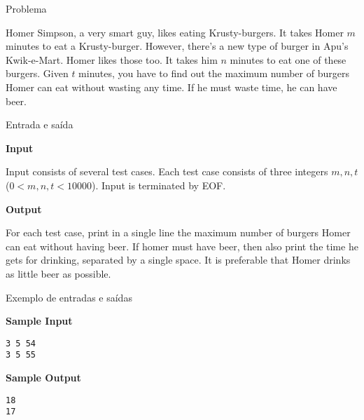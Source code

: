 
\begin{frame}[fragile]{Problema}

Homer Simpson, a very smart guy, likes eating Krusty-burgers. It takes Homer $m$ minutes to eat a
Krusty-burger. However, there’s a new type of burger in Apu’s Kwik-e-Mart. Homer likes those too.
It takes him $n$ minutes to eat one of these burgers. Given $t$ minutes, you have to find out the
maximum number of burgers Homer can eat without wasting any time. If he must waste time, he can
have beer.

\end{frame}

\begin{frame}[fragile]{Entrada e saída}

\textbf{Input}

Input consists of several test cases. Each test case consists of three integers $m, n, t$ ($0 < m,
n, t < 10000$). Input is terminated by EOF.

\vspace{0.2in}

\textbf{Output}

For each test case, print in a single line the maximum number of burgers Homer can eat without
having beer. If homer must have beer, then also print the time he gets for drinking, separated by
a single space. It is preferable that Homer drinks as little beer as possible.

\end{frame}

\begin{frame}[fragile]{Exemplo de entradas e saídas}

\begin{minipage}[t]{0.45\textwidth}
\textbf{Sample Input}
\begin{verbatim}
3 5 54
3 5 55
\end{verbatim}
\end{minipage}
\begin{minipage}[t]{0.5\textwidth}
\textbf{Sample Output}
\begin{verbatim}
18
17
\end{verbatim}
\end{minipage}
\end{frame}

